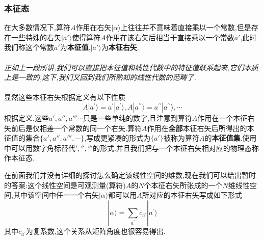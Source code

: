\documentclass[lang=cn,newtx,10pt,scheme=chinese,thmcnt=section]{elegantbook}
\begin{document}
\subsubsection*{本征态}
在大多数情况下,算符$A$作用在右矢$|\alpha\rangle$上往往并不意味着直接乘以一个常数,但是存在一些特殊的右矢$|a'\rangle$使得算符$A$作用在该右矢后相当于直接乘以一个常数$a'$,此时我们称这个常数$a'$为\textbf{本征值},$|a'\rangle$为\textbf{本征右矢}.\\\\
\textit{正如上一段所讲,我们可以直接把本征值和线性代数中的特征值联系起来,它们本质上是一致的,这下,我们又回到我们所熟知的线性代数的范畴了.}\\\\
显然这些本征右矢根据定义有以下性质
\begin{equation}
	A| a^{\prime}\rangle=a^{\prime}| a^{\prime}\rangle,A| a^{\prime\prime}\rangle=a^{\prime\prime}| a^{\prime\prime}\rangle,\cdots
\end{equation}
根据定义,这些$a',a'',a'''\cdots$只是一些单纯的数字,且注意到算符$A$作用在一个本征右矢前后是仅相差一个常数的同一个右矢.算符$A$作用在\textbf{全部}本征右矢后所得出的本征值的集合$\{a',a'',a''',\cdots\}$,写成更紧凑的形式为$\{a'\}$被称为算符$A$的\textbf{本征值集}.使用中可以用数字角标替代$','','''$的形式.并且我们把与一个本征右矢相对应的物理态称作本征态.

在前面我们并没有详细的探讨怎么确定该线性空间的维数,现在我们可以给出暂时的答案:这个线性空间是可观测量(算符)$A$的$N$个本征右矢所张成的一个$N$维线性空间,其中该空间中任一一个右矢$|\alpha\rangle$都可以用$A$所对应的本征右矢写成如下形式
\begin{equation}
	|\alpha\rangle=\sum_{a^{\prime}}c_{a^{\prime}}| a^{\prime}\rangle 
\end{equation}
其中$c_{a^{\prime}}$为复系数,这个关系从矩阵角度也很容易得出.
\end{document}
